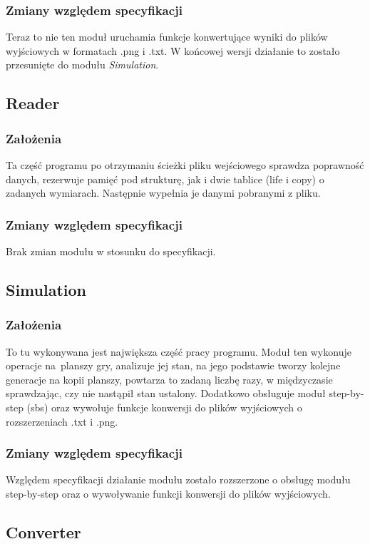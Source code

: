 \documentclass{article}
\begin{document}
\subsubsection{Zmiany względem specyfikacji}
Teraz to nie ten moduł uruchamia funkcje konwertujące wyniki do plików
wyjściowych w formatach .png i .txt. W końcowej wersji działanie to zostało
przesunięte do modułu \textit{Simulation}.

\subsection{Reader}
\subsubsection{Założenia}
Ta część programu po otrzymaniu ścieżki pliku wejściowego sprawdza
poprawność danych, rezerwuje pamięć pod strukturę, jak i dwie tablice (life i
copy) o zadanych wymiarach. Następnie wypełnia je danymi pobranymi z
pliku.

\subsubsection{Zmiany względem specyfikacji}
Brak zmian modułu w stosunku do specyfikacji.

\subsection{Simulation}
\subsubsection{Założenia}
To tu wykonywana jest największa część pracy programu. Moduł ten
wykonuje operacje na~planszy gry, analizuje jej stan, na jego podstawie
tworzy kolejne generacje na kopii planszy, powtarza to zadaną liczbę razy, w
międzyczasie sprawdzając, czy nie nastąpił stan ustalony. Dodatkowo obsługuje
moduł step-by-step (sbs) oraz wywołuje funkcje konwersji do plików
wyjściowych o rozszerzeniach .txt i .png.

\subsubsection{Zmiany względem specyfikacji}
Względem specyfikacji działanie modułu zostało rozszerzone o obsługę
modułu step-by-step oraz o wywoływanie funkcji konwersji do plików
wyjściowych.

\subsection{Converter}
\end{document}
